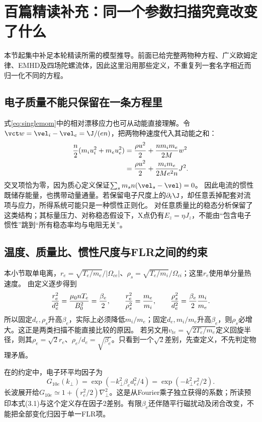 \section{百篇精读补充：同一个参数扫描究竟改变了什么}
本节起集中补足本轮精读所需的模型推导。前面已给完整两物种方程、广义欧姆定律、EMHD及四场陀螺流体，因此这里沿用那些定义，不重复列一套名字相近而归一化不同的方程。

\subsection{电子质量不能只保留在一条方程里}
式\eqref{eq:singlemom}中的相对漂移应力也可从动能直接理解。令$\vct w=\vel_i-\vel_e=\J/(en)$，把两物种速度代入其动能之和：
\begin{align}
 {n\over2}(m_iu_i^2+m_eu_e^2)
 &= {\rho u^2\over2}+{nm_im_e\over2M}w^2\\
 &= {\rho u^2\over2}+{m_im_e\over2Me^2n}J^2.
 \label{eq:selected-driftenergy}
\end{align}
交叉项恰为零，因为质心定义保证$\sum_s m_sn(\vel_s-\vel)=0$。
因此电流的惯性既储存能量，也携带动量通量。若保留电子尺度上的$\partial_t\J$，却任意丢掉配套对流项与应力，所得系统可能只是一种惯性正则化。
\citet{L160}对任意质量比的稳态分析保留了这类结构；其标量压力、对称稳态假设下，X点仍有$E_z=\eta J_z$，不能由“包含电子惯性”跳到“所有稳态率均与电阻无关”。

\subsection{温度、质量比、惯性尺度与FLR之间的约束}
本小节取单电离，$r_e=\sqrt{T_e/m_e}/|\Omega_{ce}|$、$\rho_s=\sqrt{T_e/m_i}/\Omega_{ci}$；这里$r_e$使用单分量热速度。
由定义逐步得到
\begin{equation}
 {r_e^2\over d_e^2}={\mu_0nT_e\over B_0^2}={\beta_e\over2},\qquad
 {r_e^2\over\rho_s^2}={m_e\over m_i},\qquad
 {\rho_s^2\over d_e^2}={\beta_e\over2}{m_i\over m_e}.
 \label{eq:selected-beta}
\end{equation}
所以固定$d_e,\rho_s$升高$\beta_e$，实际上必须降低$m_i/m_e$；固定$d_e,m_i/m_e$升高$\beta_e$，则$\rho_s$必增大。这正是\citet{E474}两类扫描不能直接比较的原因。
若另文用$v_{te}=\sqrt{2T_e/m_e}$定义回旋半径，则其$\rho_e=\sqrt2r_e$、$\rho_e/d_e=\sqrt{\beta_e}$。只看到一个$\sqrt2$差别，先查定义，不先判定物理矛盾。

在\citet{E474}的约定中，电子环平均因子为
\begin{equation}
 G_{10e}(k_\perp)=\exp(-k_\perp^2\beta_ed_e^2/4)
 =\exp(-k_\perp^2r_e^2/2).
\end{equation}
长波展开给$G_{10e}\simeq1+(r_e^2/2)\nabla_\perp^2$。这是从Fourier乘子独立获得的系数；所读预印本式(3.1)与这个定义存在因子2差别。有限$\beta_e$还伴随平行磁扰动及闭合改变，不能把全部变化归因于单一FLR项。

